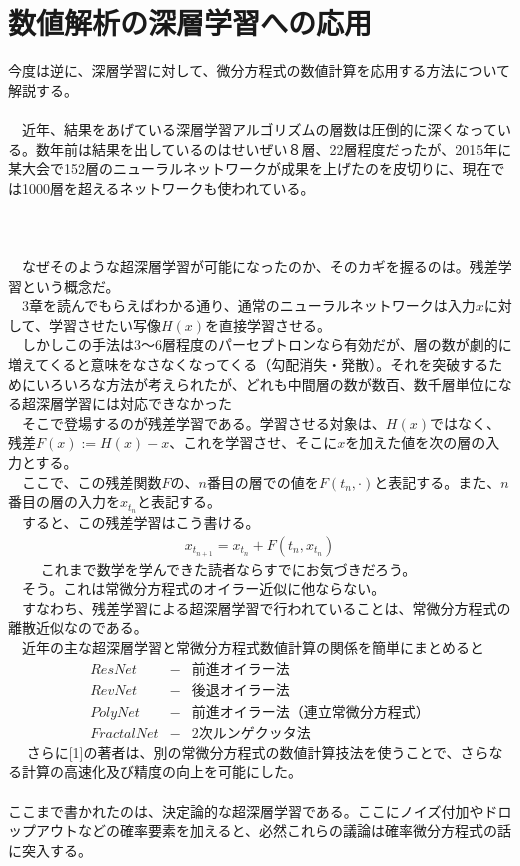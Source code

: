 \documentclass{jsarticle}
\begin{document}
\section{数値解析の深層学習への応用}
今度は逆に、深層学習に対して、微分方程式の数値計算を応用する方法について解説する。\\
　\\ 
　近年、結果をあげている深層学習アルゴリズムの層数は圧倒的に深くなっている。数年前は結果を出しているのはせいぜい８層、22層程度だったが、2015年に某大会で152層のニューラルネットワークが成果を上げたのを皮切りに、現在では1000層を超えるネットワークも使われている。\\
 　\\
 　\\
\scalebox{1.1}{1.残差学習}\\
　なぜそのような超深層学習が可能になったのか、そのカギを握るのは。残差学習という概念だ。\\
　3章を読んでもらえばわかる通り、通常のニューラルネットワークは入力$x$に対して、学習させたい写像$H(x)$を直接学習させる。\\
　しかしこの手法は3～6層程度のパーセプトロンなら有効だが、層の数が劇的に増えてくると意味をなさなくなってくる（勾配消失・発散）。それを突破するためにいろいろな方法が考えられたが、どれも中間層の数が数百、数千層単位になる超深層学習には対応できなかった\\
　そこで登場するのが残差学習である。学習させる対象は、$H(x)$ではなく、残差$F(x):=H(x)-x$、これを学習させ、そこに$x$を加えた値を次の層の入力とする。\\
　ここで、この残差関数$F$の、$n$番目の層での値を$F(t_n,\cdot)$と表記する。また、$n$番目の層の入力を$x_{t_n}$と表記する。\\
　すると、この残差学習はこう書ける。
\begin{eqnarray}
x_{t_{n+1}}=x_{t_n}+F(t_n,x_{t_n})
\end{eqnarray}　
　これまで数学を学んできた読者ならすでにお気づきだろう。\\
　そう。これは常微分方程式のオイラー近似に他ならない。\\
　すなわち、残差学習による超深層学習で行われていることは、常微分方程式の離散近似なのである。\\
　近年の主な超深層学習と常微分方程式数値計算の関係を簡単にまとめると
\begin{eqnarray}
ResNet &-& 前進オイラー法\\
RevNet &-& 後退オイラー法\\
PolyNet &-& 前進オイラー法（連立常微分方程式）\\
FractalNet &-& 2次ルンゲクッタ法
\end{eqnarray}　
さらに[1]の著者は、別の常微分方程式の数値計算技法を使うことで、さらなる計算の高速化及び精度の向上を可能にした。\\
　\\
ここまで書かれたのは、決定論的な超深層学習である。ここにノイズ付加やドロップアウトなどの確率要素を加えると、必然これらの議論は確率微分方程式の話に突入する。
\end{document}
